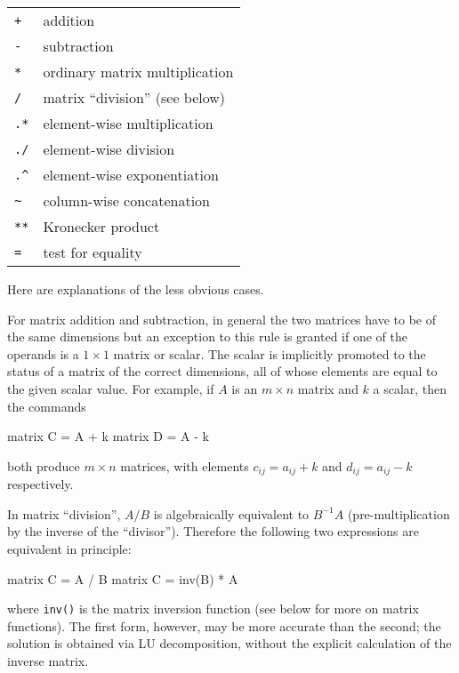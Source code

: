 \begin{center}
\begin{tabular}{ll}
\texttt{+} & addition \\
\texttt{-} & subtraction \\
\texttt{*} & ordinary matrix multiplication \\
\texttt{/} & matrix ``division'' (see below) \\
\texttt{.*} & element-wise multiplication \\
\texttt{./} & element-wise division \\
\verb+.^+ & element-wise exponentiation \\
\verb+~+ & column-wise concatenation \\
\texttt{**} & Kronecker product \\
\texttt{=} & test for equality 
\end{tabular}
\end{center}

Here are explanations of the less obvious cases. 

For matrix addition and subtraction, in general the two matrices have
to be of the same dimensions but an exception to this rule is granted
if one of the operands is a $1\times 1$ matrix or scalar.  The scalar
is implicitly promoted to the status of a matrix of the correct
dimensions, all of whose elements are equal to the given scalar value.
For example, if $A$ is an $m \times n$ matrix and $k$ a scalar, then
the commands
%
\begin{code}
matrix C = A + k
matrix D = A - k
\end{code}
%
both produce $m \times n$ matrices, with elements $c_{ij} = 
a_{ij} + k$ and $d_{ij} = a_{ij} - k$ respectively.

In matrix ``division'', $A/B$ is algebraically equivalent to
$B^{-1}A$ (pre-multiplication by the inverse of the ``divisor'').
Therefore the following two expressions are equivalent in principle:
%
\begin{code}
matrix C = A / B
matrix C = inv(B) * A
\end{code}
%
where \texttt{inv()} is the matrix inversion function (see below for
more on matrix functions).  The first form, however, may be more
accurate than the second; the solution is obtained via LU
decomposition, without the explicit calculation of the inverse matrix.

